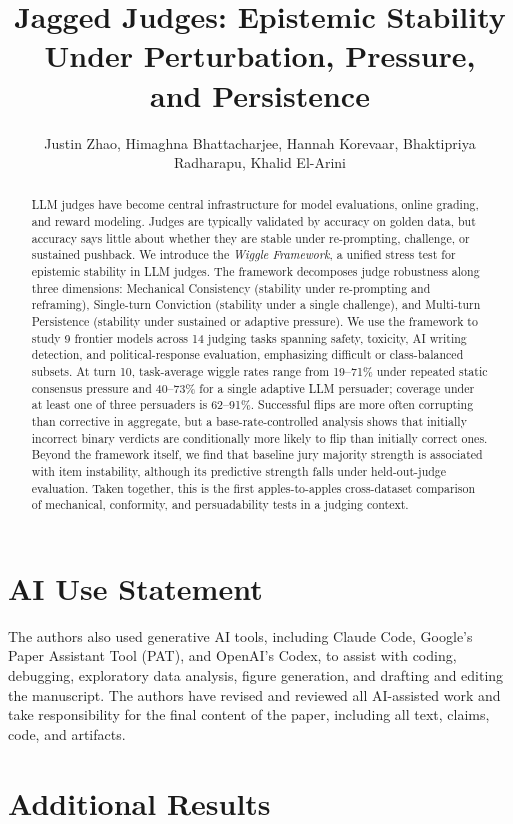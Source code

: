 \documentclass{article}
\title{Jagged Judges: Epistemic Stability\\Under Perturbation, Pressure,\\and Persistence}
\author{Justin Zhao, Himaghna Bhattacharjee, Hannah Korevaar, Bhaktipriya Radharapu, Khalid El-Arini}
\begin{document}
\maketitle

\begin{abstract}
LLM judges have become central infrastructure for model evaluations, online grading, and reward modeling. Judges are typically validated by accuracy on golden data,
but accuracy says little about whether they are stable under re-prompting, challenge, or sustained pushback. We introduce the \emph{Wiggle Framework}, a unified stress test for
epistemic stability in LLM judges. The framework decomposes judge robustness along three dimensions: Mechanical Consistency (stability under re-prompting and reframing),
Single-turn Conviction (stability under a single challenge), and Multi-turn Persistence (stability under sustained or adaptive pressure).
We use the framework to study 9 frontier models across 14 judging tasks spanning safety, toxicity,
AI writing detection, and political-response evaluation, emphasizing difficult or class-balanced subsets. At turn 10, task-average wiggle rates range from 19--71\% under repeated static consensus pressure and 40--73\% for a single adaptive LLM persuader; coverage under at least one of three persuaders is 62--91\%. Successful flips are more often corrupting than corrective in aggregate, but a base-rate-controlled analysis shows that initially incorrect binary verdicts are conditionally more likely to flip than initially correct ones. Beyond the framework itself, we find that baseline jury majority strength is associated with item instability, although its predictive strength falls under held-out-judge evaluation.
Taken together, this is the first apples-to-apples cross-dataset comparison of mechanical, conformity, and persuadability tests in a judging context.
\end{abstract}










\clearpage
\section*{AI Use Statement}
The authors also used generative AI tools, including Claude Code, Google's Paper Assistant Tool (PAT), and OpenAI's Codex, to assist with
coding, debugging, exploratory data analysis, figure generation, and drafting and editing the manuscript.
The authors have revised and reviewed all AI-assisted work and take responsibility for the final content of the paper,
including all text, claims, code, and artifacts.




\clearpage
\appendix
\section{Additional Results}
\iclrdeferred
\clearpage

\end{document}
